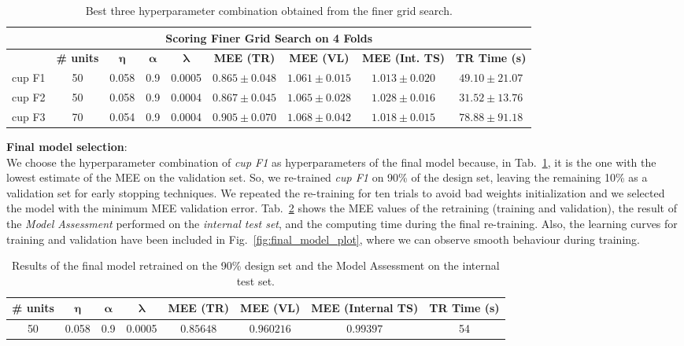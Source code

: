 \documentclass[11pt]{article}
\begin{document}
\begin{table}[H]
\small
    \centering
    \begin{tabular}{ |c|c|c|c|c|c|c|c|c|  }
     \hline
     \multicolumn{9}{|c|}{\textbf{Scoring Finer Grid Search on 4 Folds}} \\
     \hline
     \hline
      \textbf{} & \textbf{\# units} & $\boldsymbol{\eta}$ & $\boldsymbol{\alpha}$ & $\boldsymbol{\lambda}$& \textbf{MEE (TR)} & \textbf{MEE (VL)} & \textbf{MEE (Int. TS)} & \textbf{TR Time (s)}\\
     \hline
      cup F1 & 50 & 0.058  & 0.9 & 0.0005 & $0.865 \pm 0.048$ & $1.061 \pm 0.015$ & $1.013 \pm 0.020$ & $49.10 \pm 21.07$  \\
      \hline
      cup F2 & 50 & 0.058  & 0.9 & 0.0004 & $0.867 \pm 0.045$ & $1.065 \pm 0.028$ & $1.028 \pm 0.016$ & $31.52 \pm 13.76$ \\
      \hline
      cup F3 & 70 & 0.054  & 0.9 & 0.0004 & $0.905 \pm 0.070$ & $1.068 \pm 0.042$ & $1.018 \pm 0.015$ & $78.88 \pm 91.18$ \\
      \hline
    \end{tabular}
    \caption{Best three hyperparameter combination obtained from the finer grid search.}
    \label{tab:finer_grid_results}
\end{table}

\noindent\textbf{Final model selection}:\\
We choose the hyperparameter combination of \emph{cup F1} as hyperparameters of the final model because, in Tab.~\ref{tab:finer_grid_results}, it is the one with the lowest estimate of the MEE on the validation set.
So, we re-trained \emph{cup F1} on 90\% of the design set, leaving the remaining 10\% as a validation set for early stopping techniques. We repeated the re-training for ten trials to avoid bad weights initialization and we selected the model with the minimum MEE validation error. Tab.~\ref{tab:final_model} shows the MEE values of the retraining (training and validation), the result of the \textit{Model Assessment} performed on the \textit{internal test set}, and the computing time during the final re-training.  Also, the learning curves for training and validation have been included in Fig.~\ref{fig:final_model_plot}, where we can observe smooth behaviour during training.
\begin{table}[H]
\small
    \centering
    \begin{tabular}{ |c|c|c|c|c|c|c|c|  }
     \hline
     \textbf{\# units} & $\boldsymbol{\eta}$ & $\boldsymbol{\alpha}$ & $\boldsymbol{\lambda}$& \textbf{MEE (TR)} & \textbf{MEE (VL)} & \textbf{MEE (Internal TS)}& \textbf{TR Time (s)}\\
     \hline
      50 & 0.058  & 0.9 & 0.0005 & $0.85648$ & $0.960216$ & $0.99397$ & 54 \\
      \hline
    \end{tabular}
    \caption{Results of the final model retrained on the 90\% design set and the Model Assessment on the internal test set.}
    \label{tab:final_model}
\end{table}
\end{document}
